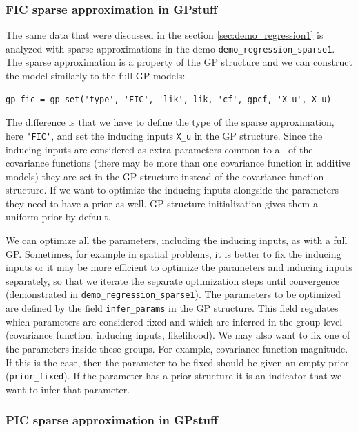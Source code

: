 \documentclass[twoside,11pt]{article}
\newcommand{\code}[1]{{\normalfont\texttt{#1}}}
\begin{document}
\subsubsection{FIC sparse approximation in GPstuff}

The same data that were discussed in the section
\ref{sec:demo_regression1} is analyzed with sparse approximations in
the demo \code{demo\_regression\_sparse1}. The sparse approximation is
a property of the GP structure and we can construct the model
similarly to the full GP models:
%
\begin{verbatim}
gp_fic = gp_set('type', 'FIC', 'lik', lik, 'cf', gpcf, 'X_u', X_u)
\end{verbatim}
%
The difference is that we have to define the type of the sparse
approximation, here \verb|'FIC'|, and set the inducing inputs
\code{X\_u} in the GP structure. Since the inducing inputs are
considered as extra parameters common to all of the covariance
functions (there may be more than one covariance function in additive
models) they are set in the GP structure instead of the covariance
function structure. If we want to optimize the inducing inputs
alongside the parameters they need to have a prior as well.  GP
structure initialization gives them a uniform prior by default.

We can optimize all the parameters, including the inducing inputs, as
with a full GP. Sometimes, for example in spatial problems, it is
better to fix the inducing inputs
\citep{Vanhatalo+Pietilainen+Vehtari:2010} or it may be more efficient
to optimize the parameters and inducing inputs separately, so that we
iterate the separate optimization steps until convergence
(demonstrated in \code{demo\_regression\_sparse1}).  The parameters to
be optimized are defined by the field \code{infer\_params} in the GP
structure. This field regulates which parameters are considered fixed
and which are inferred in the group level (covariance function,
inducing inputs, likelihood).  We may also want to fix one of the
parameters inside these groups. For example, covariance function
magnitude.  If this is the case, then the parameter to be fixed should
be given an empty prior (\code{prior\_fixed}). If the parameter has a
prior structure it is an indicator that we want to infer that
parameter.
 
\subsubsection{PIC sparse approximation in GPstuff}\label{sec:PIC_regression}
\end{document}
